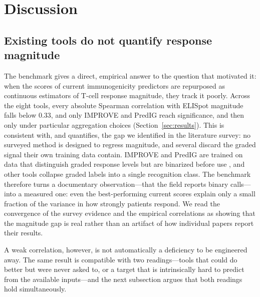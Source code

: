 \section{Discussion}
\label{sec:discussion}

\subsection{Existing tools do not quantify response magnitude}
\label{sec:disc-gap}

The benchmark gives a direct, empirical answer to the question that motivated it:
when the scores of current immunogenicity predictors are repurposed as continuous
estimators of T-cell response magnitude, they track it poorly. Across the eight
tools, every absolute Spearman correlation with ELISpot magnitude falls below
$0.33$, and only IMPROVE and PredIG reach significance, and then only under
particular aggregation choices (Section~\ref{sec:results}). This is consistent
with, and quantifies, the gap we identified in the literature survey: no surveyed
method is designed to regress magnitude, and several discard the graded signal
their own training data contain. IMPROVE and PredIG are trained on data that
distinguish graded response levels but are binarized before use
\cite{IMPROVE2024,PredIG2025}, and other tools collapse graded labels into a
single recognition class. The benchmark therefore turns a documentary
observation---that the field reports binary calls---into a measured one: even the
best-performing current scores explain only a small fraction of the variance in
how strongly patients respond. We read the convergence of the survey evidence and
the empirical correlations as showing that the magnitude gap is real rather than
an artifact of how individual papers report their results.

A weak correlation, however, is not automatically a deficiency to be engineered
away. The same result is compatible with two readings---tools that could do
better but were never asked to, or a target that is intrinsically hard to predict
from the available inputs---and the next subsection argues that both readings hold
simultaneously.

